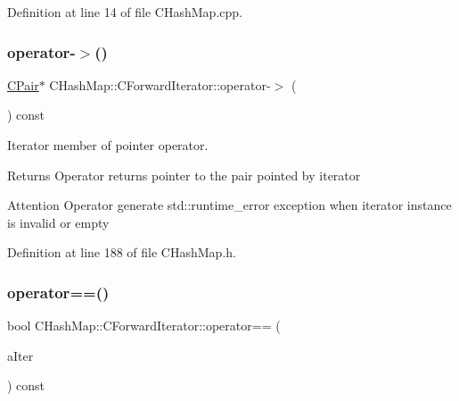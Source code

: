 Definition at line 14 of file C\+Hash\+Map.\+cpp.

\mbox{\label{class_c_hash_map_1_1_c_forward_iterator_a65fde4bd503e69c29b15688cd8c21eaf}} 
\subsubsection{\texorpdfstring{operator-\/$>$()}{operator->()}}
{\footnotesize\ttfamily \hyperlink{class_c_pair}{C\+Pair}$\ast$ C\+Hash\+Map\+::\+C\+Forward\+Iterator\+::operator-\/$>$ (\begin{DoxyParamCaption}{ }\end{DoxyParamCaption}) const\hspace{0.3cm}{\ttfamily [inline]}}



Iterator member of pointer operator. 

\begin{DoxyReturn}{Returns}
Operator returns pointer to the pair pointed by iterator 
\end{DoxyReturn}
\begin{DoxyAttention}{Attention}
Operator generate {\ttfamily std\+::runtime\+\_\+error} exception when iterator instance is invalid or empty 
\end{DoxyAttention}


Definition at line 188 of file C\+Hash\+Map.\+h.

\mbox{\label{class_c_hash_map_1_1_c_forward_iterator_a251df2cf775a888851a03ac68015f705}} 
\subsubsection{\texorpdfstring{operator==()}{operator==()}}
{\footnotesize\ttfamily bool C\+Hash\+Map\+::\+C\+Forward\+Iterator\+::operator== (\begin{DoxyParamCaption}\item[{const \hyperlink{class_c_hash_map_1_1_c_forward_iterator}{C\+Forward\+Iterator} \&}]{a\+Iter }\end{DoxyParamCaption}) const\hspace{0.3cm}{\ttfamily [inline]}}



